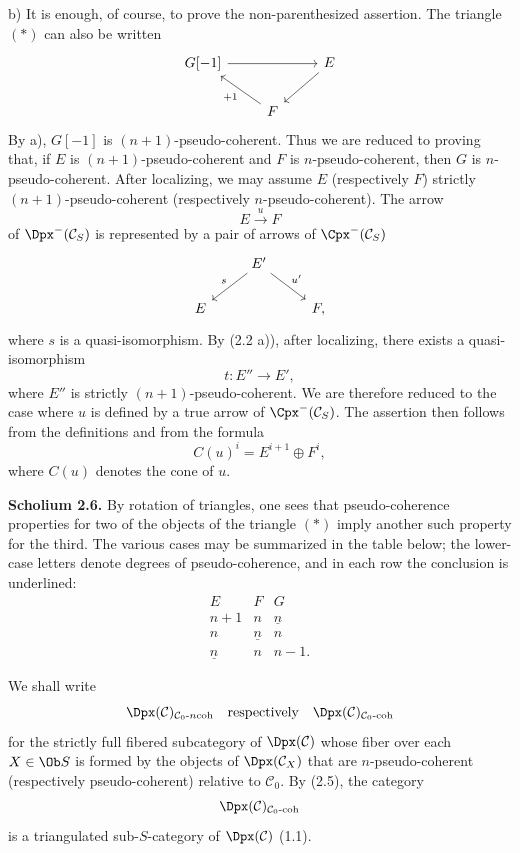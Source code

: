 \documentclass[11pt]{article}
\begin{document}
b) It is enough, of course, to prove the non-parenthesized assertion. The triangle \((*)\) can also be written
\[
\begin{tikzcd}
G[-1] \arrow[rr] && E \arrow[dl]\\
& F \arrow[ul,"+1"] &
\end{tikzcd}
\]
By a), \(G[-1]\) is \((n+1)\)-pseudo-coherent. Thus we are reduced to proving that, if \(E\) is \((n+1)\)-pseudo-coherent and \(F\) is \(n\)-pseudo-coherent, then \(G\) is \(n\)-pseudo-coherent. After localizing, we may assume \(E\) (respectively \(F\)) strictly \((n+1)\)-pseudo-coherent (respectively \(n\)-pseudo-coherent). The arrow
\[
  E\xrightarrow{u}F
\]
of \(\Dpx^-(\mathcal C_S)\) is represented by a pair of arrows of \(\Cpx^-(\mathcal C_S)\)
\[
\begin{tikzcd}
& E' \arrow[dl,"s"'] \arrow[dr,"u'"]\\
E && F ,
\end{tikzcd}
\]
where \(s\) is a quasi-isomorphism. By (2.2 a)), after localizing, there exists a quasi-isomorphism
\[
  t:E''\longrightarrow E',
\]
where \(E''\) is strictly \((n+1)\)-pseudo-coherent. We are therefore reduced to the case where \(u\) is defined by a true arrow of \(\Cpx^-(\mathcal C_S)\). The assertion then follows from the definitions and from the formula
\[
  C(u)^i=E^{i+1}\oplus F^i,
\]
where \(C(u)\) denotes the cone of \(u\).

\textbf{Scholium 2.6.} By rotation of triangles, one sees that pseudo-coherence properties for two of the objects of the triangle \((*)\) imply another such property for the third. The various cases may be summarized in the table below; the lower-case letters denote degrees of pseudo-coherence, and in each row the conclusion is underlined:
\[
\begin{array}{ccc}
E&F&G\\[0.2em]
n+1&n&\underline n\\
n&\underline n&n\\
\underline n&n&n-1 .
\end{array}
\]

We shall write
\[
  \Dpx(\mathcal C)_{\mathcal C_0\text{-}n\mathrm{coh}}
  \quad\text{respectively}\quad
  \Dpx(\mathcal C)_{\mathcal C_0\text{-}\mathrm{coh}}
\]
for the strictly full fibered subcategory of \(\Dpx(\mathcal C)\) whose fiber over each \(X\in\Ob S\) is formed by the objects of \(\Dpx(\mathcal C_X)\) that are \(n\)-pseudo-coherent (respectively pseudo-coherent) relative to \(\mathcal C_0\). By (2.5), the category
\[
  \Dpx(\mathcal C)_{\mathcal C_0\text{-}\mathrm{coh}}
\]
is a triangulated sub-\(S\)-category of \(\Dpx(\mathcal C)\) (1.1).
\end{document}
